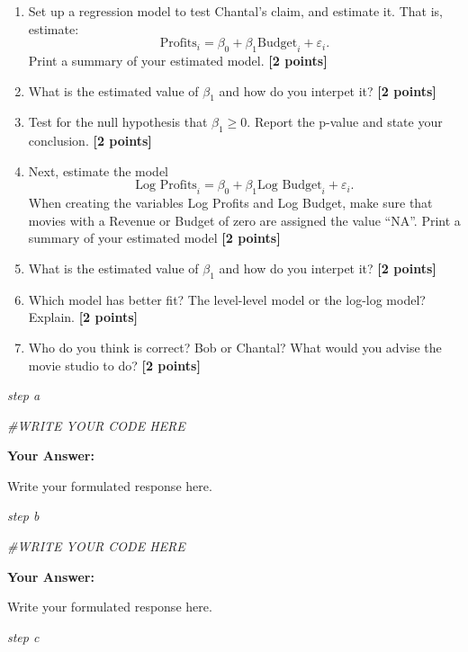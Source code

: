 \documentclass[
]{article}
\newenvironment{Shaded}{\begin{snugshade}}{\end{snugshade}}
\newcommand{\CommentTok}[1]{\textcolor[rgb]{0.56,0.35,0.01}{\textit{#1}}}
\providecommand{\tightlist}{%
  \setlength{\itemsep}{0pt}\setlength{\parskip}{0pt}}
\begin{document}
\begin{enumerate}
\def\labelenumi{\alph{enumi}.}
\tightlist
\item
  Set up a regression model to test Chantal's claim, and estimate it.
  That is, estimate:
  \[\text{Profits}_i=\beta_0+\beta_1 \text{Budget}_i +\varepsilon_i.\]
  Print a summary of your estimated model. \textbf{[2 points]}
\item
  What is the estimated value of \(\beta_1\) and how do you interpet it?
  \textbf{[2 points]}
\item
  Test for the null hypothesis that \(\beta_1 \geq 0\). Report the
  p-value and state your conclusion. \textbf{[2 points]}
\item
  Next, estimate the model
  \[\text{Log Profits}_i=\beta_0+\beta_1 \text{Log Budget}_i +\varepsilon_i.\]
  When creating the variables Log Profits and Log Budget, make sure that
  movies with a Revenue or Budget of zero are assigned the value ``NA''.
  Print a summary of your estimated model \textbf{[2 points]}
\item
  What is the estimated value of \(\beta_1\) and how do you interpet it?
  \textbf{[2 points]}
\item
  Which model has better fit? The level-level model or the log-log
  model? Explain. \textbf{[2 points]}
\item
  Who do you think is correct? Bob or Chantal? What would you advise the
  movie studio to do? \textbf{[2 points]}
\end{enumerate}

\emph{step a}

\begin{Shaded}
\begin{Highlighting}[]
\CommentTok{\#WRITE YOUR CODE HERE}
\end{Highlighting}
\end{Shaded}

\textbf{Your Answer:}

Write your formulated response here.

\emph{step b}

\begin{Shaded}
\begin{Highlighting}[]
\CommentTok{\#WRITE YOUR CODE HERE}
\end{Highlighting}
\end{Shaded}

\textbf{Your Answer:}

Write your formulated response here.

\emph{step c}
\end{document}
